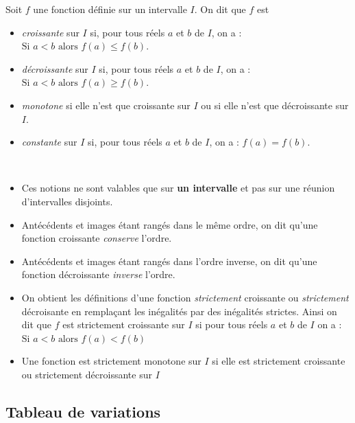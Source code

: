 \begin{definition}
Soit $f$ une fonction d\'efinie sur un intervalle $I$. On dit que $f$ est
\begin{itemize}
	\item \emph{croissante} sur $I$ si, pour tous r\'eels $a$ et $b$ de $I$, on a :\\
$\text{Si } a<b \text{ alors } f(a)\leqslant f(b).$
	\item \emph{d\'ecroissante} sur $I$ si, pour tous r\'eels $a$ et $b$ de $I$, on a :\\
$\text{Si } a<b \text{ alors } f(a)\geqslant f(b).$
	\item \emph{monotone} si elle n'est que croissante sur $I$ ou si elle n'est que d\'ecroissante sur $I$.
	\item \emph{constante} sur $I$ si, pour tous r\'eels $a$ et $b$ de $I$, on a : $f(a)=f(b)$.
\end{itemize}
\end{definition}


\begin{rmqs}~
\begin{itemize}
	\item Ces notions ne sont valables que sur \textbf{un intervalle} et pas sur une r\'eunion d'intervalles disjoints.
	\item Ant\'ec\'edents et images \'etant rang\'es dans le même ordre, on dit qu'une fonction croissante \emph{conserve} l'ordre.
	\item Ant\'ec\'edents et images \'etant rang\'es dans l'ordre inverse, on dit qu'une fonction d\'ecroissante \emph{inverse} l'ordre.
	\item On obtient les d\'efinitions d'une fonction \emph{strictement} croissante ou \emph{strictement} d\'ecroisante en remplaçant les in\'egalit\'es par des in\'egalit\'es strictes. Ainsi on dit que $f$ est strictement croissante sur $I$ si pour tous r\'eels $a$ et $b$ de $I$ on a : \\ $\text{Si } a<b \text{ alors } f(a)<f(b)$
	\item Une fonction est strictement monotone sur $I$ si elle est strictement croissante ou strictement d\'ecroissante sur $I$
\end{itemize}
\end{rmqs}

\subsection{Tableau de variations}

